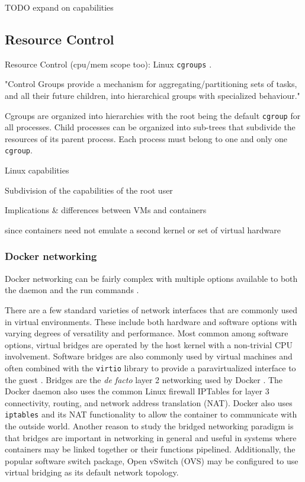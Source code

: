 TODO expand on capabilities


\subsection{Resource Control}
\label{sec:resource_control}
Resource Control (cpu/mem scope too): 
Linux \texttt{cgroups} \autocite{kernelcgroups}.

"Control Groups provide a mechanism for aggregating/partitioning sets of tasks, and all their future children, into hierarchical groups with specialized behaviour."

Cgroups are organized into hierarchies with the root being the default \texttt{cgroup} for all processes.  Child processes can be organized into sub-trees that subdivide the resources of its parent process.  Each process must belong to one and only one \texttt{cgroup}. 

Linux capabilities

Subdivision of the capabilities of the root user

Implications \& differences between VMs and containers

since containers need not emulate a second kernel or set of virtual hardware

\subsubsection{Docker networking} %
\label{ssub:dockernetworking}

Docker networking can be fairly complex with multiple options available to both the daemon and the run commands \autocite{dockernetworking1}.

There are a few standard varieties of network interfaces that are commonly used in virtual environments.
These include both hardware and software options with varying degrees of versatility and performance.  
Most common among software options, virtual bridges are operated by the host kernel with a non-trivial CPU involvement. 
Software bridges are also commonly used by virtual machines and often combined with the \texttt{virtio} library to provide a paravirtualized interface to the guest \autocite{_virtio_1}. 
Bridges are the \emph{de facto} layer 2 networking used by Docker \autocite{dockernetworking1}.  
The Docker daemon also uses the common Linux firewall IPTables for layer 3 connectivity, routing, and network address translation (NAT).
Docker also uses \texttt{iptables} and its NAT functionality to allow the container to communicate with the outside world.
Another reason to study the bridged networking paradigm is that bridges are important in networking in general and useful in systems where containers may be linked together or their functions pipelined.
Additionally, the popular software switch package, Open vSwitch (OVS) may be configured to use virtual bridging as its default network topology.


